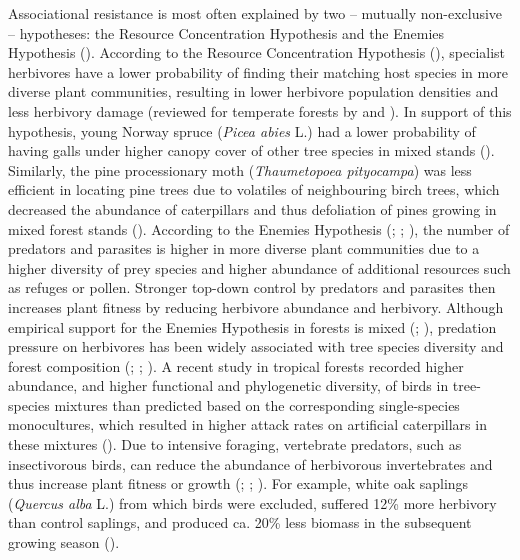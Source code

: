 \documentclass[b5paper,10pt]{book} %
\begin{document}
	Associational resistance is most often explained by two – mutually non-exclusive – hypotheses: the Resource Concentration Hypothesis and the Enemies Hypothesis (\citealt{Jactel2007}). According to the Resource Concentration Hypothesis (\citealt{Root1973}), specialist herbivores have a lower probability of finding their matching host species in more diverse plant communities, resulting in lower herbivore population densities and less herbivory damage (reviewed for temperate forests by \citealt{Jactel2005} and \citealt{Castagneyrol2014}). In support of this hypothesis, young Norway spruce (\textit{Picea abies} L.) had a lower probability of having galls under higher canopy cover of other tree species in mixed stands (\citealt{Muiruri2017}). Similarly, the pine processionary moth (\textit{Thaumetopoea pityocampa}) was less efficient in locating pine trees due to volatiles of neighbouring birch trees, which decreased the abundance of caterpillars and thus defoliation of pines growing in mixed forest stands (\citealt{Jactel2011}). According to the Enemies Hypothesis (\citealt{Root1973}; \citealt{Letourneau1987}; \citealt{Russell1989}), the number of predators and parasites is higher in more diverse plant communities due to a higher diversity of prey species and higher abundance of additional resources such as refuges or pollen. Stronger top-down control by predators and parasites then increases plant fitness by reducing herbivore abundance and herbivory. Although empirical support for the Enemies Hypothesis in forests is mixed (\citealt{Zhang2011a}; \citealt{Grossman2018}), predation pressure on herbivores has been widely associated with tree species diversity and forest composition (\citealt{Giffard2012}; \citealt{Muiruri2016}; \citealt{Yang2018}). A recent study in tropical forests recorded higher abundance, and higher functional and phylogenetic diversity, of birds in tree-species mixtures than predicted based on the corresponding single-species monocultures, which resulted in higher attack rates on artificial caterpillars in these mixtures (\citealt{Nell2018}). Due to intensive foraging, vertebrate predators, such as insectivorous birds, can reduce the abundance of herbivorous invertebrates and thus increase plant fitness or growth (\citealt{Schmitz2000}; \citealt{Mooney2010}; \citealt{Mantyla2011}). For example, white oak saplings (\textit{Quercus alba} L.) from which birds were excluded, suffered 12\% more herbivory than control saplings, and produced ca. 20\% less biomass in the subsequent growing season (\citealt{Marquis1994}). 
\end{document}
